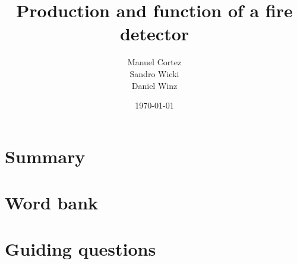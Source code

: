 \documentclass[a4paper]{article}
\title{Production and function of a fire detector}
\author{Manuel Cortez\\Sandro Wicki\\Daniel Winz}
\date{\today}
\begin{document}
\maketitle

\section{Summary}


\clearpage

\section{Word bank}


\section{Guiding questions}


\clearpage

\nocite{*}

\end{document}
